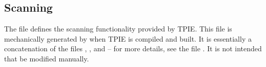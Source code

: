  





\subsection{Scanning}

The file  defines the scanning
functionality provided by TPIE. This file is mechanically generated
by  when TPIE is compiled and built. It is essentially a concatenation
of the files ,
, and
 -- for more
details, see the file . It is not
intended that  be modified
manually.

